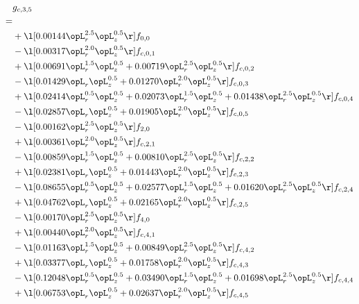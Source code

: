 \begin{alignat}{2} 
\label{eq:g_35_0} 
& g_{c,3,5} \nonumber \\ 
 = \\ 
& + \l[  0.00144 \opL_r^{2.5} \opL_z^{0.5}  \r] f_{0,0} \nonumber \\ 
& - \l[  0.00317 \opL_r^{2.0} \opL_z^{0.5}  \r] f_{c,0,1} \nonumber \\ 
& + \l[  0.00691 \opL_r^{1.5} \opL_z^{0.5} +  0.00719 \opL_r^{2.5} \opL_z^{0.5}  \r] f_{c,0,2} \nonumber \\ 
& - \l[  0.01429 \opL_r \opL_z^{0.5} +  0.01270 \opL_r^{2.0} \opL_z^{0.5}  \r] f_{c,0,3} \nonumber \\ 
& + \l[  0.02414 \opL_r^{0.5} \opL_z^{0.5} +  0.02073 \opL_r^{1.5} \opL_z^{0.5} +  0.01438 \opL_r^{2.5} \opL_z^{0.5}  \r] f_{c,0,4} \nonumber \\ 
& - \l[  0.02857 \opL_r \opL_z^{0.5} +  0.01905 \opL_r^{2.0} \opL_z^{0.5}  \r] f_{c,0,5} \nonumber \\ 
& - \l[  0.00162 \opL_r^{2.5} \opL_z^{0.5}  \r] f_{2,0} \nonumber \\ 
& + \l[  0.00361 \opL_r^{2.0} \opL_z^{0.5}  \r] f_{c,2,1} \nonumber \\ 
& - \l[  0.00859 \opL_r^{1.5} \opL_z^{0.5} +  0.00810 \opL_r^{2.5} \opL_z^{0.5}  \r] f_{c,2,2} \nonumber \\ 
& + \l[  0.02381 \opL_r \opL_z^{0.5} +  0.01443 \opL_r^{2.0} \opL_z^{0.5}  \r] f_{c,2,3} \nonumber \\ 
& - \l[  0.08655 \opL_r^{0.5} \opL_z^{0.5} +  0.02577 \opL_r^{1.5} \opL_z^{0.5} +  0.01620 \opL_r^{2.5} \opL_z^{0.5}  \r] f_{c,2,4} \nonumber \\ 
& + \l[  0.04762 \opL_r \opL_z^{0.5} +  0.02165 \opL_r^{2.0} \opL_z^{0.5}  \r] f_{c,2,5} \nonumber \\ 
& - \l[  0.00170 \opL_r^{2.5} \opL_z^{0.5}  \r] f_{4,0} \nonumber \\ 
& + \l[  0.00440 \opL_r^{2.0} \opL_z^{0.5}  \r] f_{c,4,1} \nonumber \\ 
& - \l[  0.01163 \opL_r^{1.5} \opL_z^{0.5} +  0.00849 \opL_r^{2.5} \opL_z^{0.5}  \r] f_{c,4,2} \nonumber \\ 
& + \l[  0.03377 \opL_r \opL_z^{0.5} +  0.01758 \opL_r^{2.0} \opL_z^{0.5}  \r] f_{c,4,3} \nonumber \\ 
& - \l[  0.12048 \opL_r^{0.5} \opL_z^{0.5} +  0.03490 \opL_r^{1.5} \opL_z^{0.5} +  0.01698 \opL_r^{2.5} \opL_z^{0.5}  \r] f_{c,4,4} \nonumber \\ 
& + \l[  0.06753 \opL_r \opL_z^{0.5} +  0.02637 \opL_r^{2.0} \opL_z^{0.5}  \r] f_{c,4,5} \nonumber \\ 
\end{alignat} 


